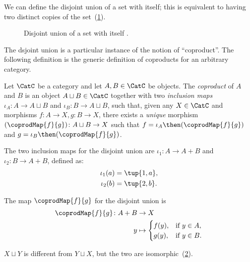 We can define the disjoint union of a set with itself; this is equivalent
to having two distinct copies of the set~(\cref{fig:disjointself}).

\begin{figure}[h!]
\begin{center}
    \caption{Disjoint union of a set with itself \label{fig:disjointself}.}
\end{center}
\end{figure}

The dsjoint union is a particular instance of the notion of ``coproduct''.
The following definition is the generic definition of coproducts for an arbitrary category.

\begin{shaded}
\begin{definition}[Coproduct]
Let $\CatC$ be a category and let $A, B \in \CatC$ be objects. The \emph{coproduct} of $A$ and $B$ is an object $A \sqcup B \in \CatC$ together with two \emph{inclusion maps} $\iota_A \colon A \to A \sqcup B $ and $\iota_B \colon B \to A  \sqcup B $, such that, given any $X \in \CatC$ and morphisms $f\colon  A \to X, g \colon B \to X$, there exists a \emph{unique} morphism $(\coprodMap{f}{g}) \colon A \sqcup B \to X$ such that $f = \iota_A\then (\coprodMap{f}{g})$ and $g = \iota_B \then (\coprodMap{f}{g})$.
\end{definition}
\end{shaded}

\begin{example}

The two inclusion maps for the disjoint union are $\iota_1\colon A \to A + B$ and $\iota_2\colon B \to A + B$, defined as:
\begin{equation}
\begin{aligned}
    \iota_1(a) &= \tup{1, a},\\
    \iota_2(b) &= \tup{2, b}.
\end{aligned}
\end{equation}

The map $\coprodMap{f}{g}$ for the disjoint union is
\begin{equation}
\begin{aligned}
    \coprodMap{f}{g} \colon  A + B &\to X \\
    y &   \mapsto
    \begin{cases}
        f(y), & \text{if } y \in A, \\
        g(y), & \text{if } y \in B.
    \end{cases}
\end{aligned}
\end{equation}
\end{example}



$X \sqcup Y$ is different from $Y \sqcup X$, but the two are isomorphic~(\cref{fig:e16}).

\begin{figure}[h!]
    \centering
    \caption{\label{fig:e16}}
\end{figure}
